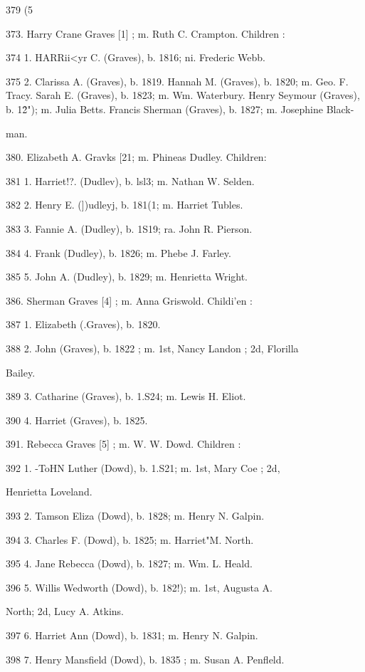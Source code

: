 379 (5 




373. Harry Crane Graves [1] ; m. Ruth C. Crampton. Children : 

374 1. HARRii<yr C. (Graves), b. 1816; ni. Frederic Webb. 

375 2. Clarissa A. (Graves), b. 1819. 
Hannah M. (Graves), b. 1820; m. Geo. F. Tracy. 
Sarah E. (Graves), b. 1823; m. Wm. Waterbury. 
Henry Seymour (Graves), b. 1\^2"); m. Julia Betts. 
Francis Sherman (Graves), b. 1827; m. Josephine Black- 

man. 

380. Elizabeth A. Gravks [21; m. Phineas Dudley. Children: 

381 1. Harriet!?. (Dudlev), b. lsl3; m. Nathan W. Selden. 

382 2. Henry E. (])udleyj, b. 181(1; m. Harriet Tubles. 

383 3. Fannie A. (Dudley), b. 1S19; ra. John R. Pierson. 

384 4. Frank (Dudley), b. 1826; m. Phebe J. Farley. 

385 5. John A. (Dudley), b. 1829; m. Henrietta Wright. 

386. Sherman Graves [4] ; m. Anna Griswold. Childi'en : 

387 1. Elizabeth (.Graves), b. 1820. 

388 2. John (Graves), b. 1822 ; m. 1st, Nancy Landon ; 2d, Florilla 

Bailey. 

389 3. Catharine (Graves), b. 1.S24; m. Lewis H. Eliot. 

390 4. Harriet (Graves), b. 1825. 

391. Rebecca Graves [5] ; m. W. W. Dowd. Children : 

392 1. -ToHN Luther (Dowd), b. 1.S21; m. 1st, Mary Coe ; 2d, 

Henrietta Loveland. 

393 2. Tamson Eliza (Dowd), b. 1828; m. Henry N. Galpin. 

394 3. Charles F. (Dowd), b. 1825; m. Harriet"M. North. 

395 4. Jane Rebecca (Dowd), b. 1827; m. Wm. L. Heald. 

396 5. Willis Wedworth (Dowd), b. 182!); m. 1st, Augusta A. 

North; 2d, Lucy A. Atkins. 

397 6. Harriet Ann (Dowd), b. 1831; m. Henry N. Galpin. 

398 7. Henry Mansfield (Dowd), b. 1835 ; m. Susan A. Penfleld. 

